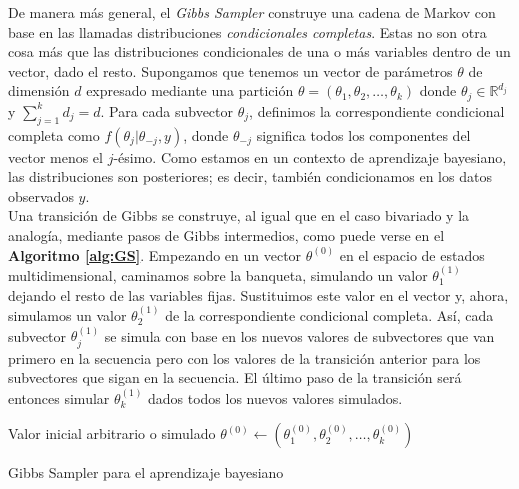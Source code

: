 De manera más general, el \textit{Gibbs Sampler} construye una cadena de Markov con base en las llamadas distribuciones \textit{condicionales completas}. Estas no son otra cosa más que las distribuciones condicionales de una o más variables dentro de un vector, dado el resto. Supongamos que tenemos un vector de parámetros $\theta$ de dimensión $d$ expresado mediante una partición $\theta = (\theta_1, \theta_2, \dots, \theta_k)$ donde $\theta_j \in \mathbb{R}^{d_j}$ y $\sum\limits_{j=1}^k d_j = d$. Para cada subvector $\theta_j$, definimos la correspondiente condicional completa como $f(\theta_j|\theta_{-j},y)$, donde $\theta_{-j}$ significa todos los componentes del vector menos el $j$-ésimo. Como estamos en un contexto de aprendizaje bayesiano, las distribuciones son posteriores; es decir, también condicionamos en los datos observados $y$.\\

Una transición de Gibbs se construye, al igual que en el caso bivariado y la analogía, mediante pasos de Gibbs intermedios, como puede verse en el \textbf{Algoritmo \ref{alg:GS}}. Empezando en un vector $\theta^{(0)}$ en el espacio de estados multidimensional, caminamos sobre la banqueta, simulando un valor $\theta_1^{(1)}$ dejando el resto de las variables fijas. Sustituimos este valor en el vector y, ahora, simulamos un valor $\theta_2^{(1)}$ de la correspondiente condicional completa. Así, cada subvector $\theta_j^{(1)}$ se simula con base en los nuevos valores de subvectores que van primero en la secuencia pero con los valores de la transición anterior para los subvectores que sigan en la secuencia. El último paso de la transición será entonces simular $\theta_k^{(1)}$ dados todos los nuevos valores simulados.\\ 

\begin{algorithm}
\DontPrintSemicolon
Valor inicial arbitrario o simulado $\theta^{(0)}\leftarrow (\theta_1^{(0)},\theta_2^{(0)},\dots,\theta_k^{(0)})$\;

\caption{Gibbs Sampler para el aprendizaje bayesiano \label{alg:GS}}
\end{algorithm}

